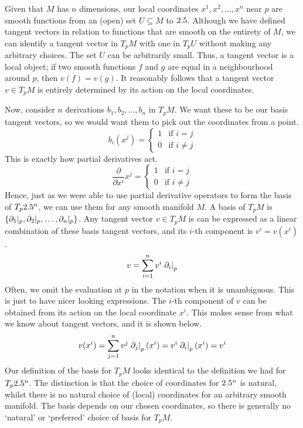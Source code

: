 \documentclass[a4paper,12pt]{article}
\begin{document}
Given that $M$ has $n$ dimensions, our local coordinates $x^1, x^2, \ldots, x^n$ near $p$ are smooth functions from an (open) set $U \subseteq M$ to $2.5$.
Although we have defined tangent vectors in relation to functions that are smooth on the entirety of $M$, we can identify a tangent vector in $T_p M$ with one in $T_p U$ without making any arbitrary choices.
The set $U$ can be arbitrarily small.
Thus, a tangent vector is a local object; if two smooth functions $f$ and $g$ are equal in a neighbourhood around $p$, then $v(f) = v(g)$.
It reasonably follows that a tangent vector $v \in T_p M$ is entirely determined by its action on the local coordinates.

Now, consider $n$ derivations $b_1, b_2, \ldots, b_n$ in $T_p M$.
We want these to be our basis tangent vectors, so we would want them to pick out the coordinates from a point.
\begin{equation*}
    b_i (x^j) = \begin{cases}
        1 & \text{if } i = j \\
        0 & \text{if } i \neq j
    \end{cases}
\end{equation*}
This is exactly how partial derivatives act.
\begin{equation*}
    \frac{\partial}{\partial x^i} x^j = \begin{cases}
        1 & \text{if } i = j \\
        0 & \text{if } i \neq j
    \end{cases}
\end{equation*}
Hence, just as we were able to use partial derivative operators to form the basis of $T_p 2.5^n$, we can use them for any smooth manifold $M$.
A basis of $T_p M$ is $\{\eval*{\partial_1}{p}, \eval*{\partial_2}{p}, \ldots, \eval*{\partial_n}{p}\}$.
Any tangent vector $v \in T_p M$ is can be expressed as a linear combination of these basis tangent vectors, and its $i$-th component is $v^i = v(x^i)$.
\begin{equation*}
    v = \sum_{i=1}^{n} v^i \eval{\partial_i}{p}
\end{equation*}
Often, we omit the evaluation at $p$ in the notation when it is unambiguous.
This is just to have nicer looking expressions.
The $i$-th component of $v$ can be obtained from its action on the local coordinate $x^i$.
This makes sense from what we know about tangent vectors, and it is shown below.
\begin{equation*}
    v(x^i) = \sum_{j=1}^{n} v^j \eval{\partial_j}{p}(x^i) = v^i \eval{\partial_i}{p}(x^i) = v^i
\end{equation*}
Our definition of the basis for $T_p M$ looks identical to the definition we had for $T_p 2.5^n$.
The distinction is that the choice of coordinates for $2.5^n$ is natural, whilst there is no natural choice of (local) coordinates for an arbitrary smooth manifold.
The basis depends on our chosen coordinates, so there is generally no `natural' or `preferred' choice of basis for $T_p M$.
\end{document}
